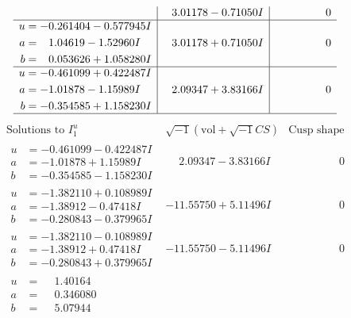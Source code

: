 \documentclass[1p]{elsarticle_modified}
\theoremstyle{definition}
\newcommand{\I}{\sqrt{-1}}
\begin{document}
$$\begin{array}{c|c|c}
 & \phantom{-}3.01178 - 0.71050 I & \phantom{-0.000000 } 0 \\ \hline\begin{aligned}
u &= -0.261404 - 0.577945 I \\
a &= \phantom{-}1.04619 - 1.52960 I \\
b &= \phantom{-}0.053626 + 1.058280 I\end{aligned}
 & \phantom{-}3.01178 + 0.71050 I & \phantom{-0.000000 } 0 \\ \hline\begin{aligned}
u &= -0.461099 + 0.422487 I \\
a &= -1.01878 - 1.15989 I \\
b &= -0.354585 + 1.158230 I\end{aligned}
 & \phantom{-}2.09347 + 3.83166 I & \phantom{-0.000000 } 0\\
 \hline 
 \end{array}$$\newpage$$\begin{array}{c|c|c}  
\text{Solutions to }I^u_{1}& \I (\text{vol} + \sqrt{-1}CS) & \text{Cusp shape}\\
 \hline 
\begin{aligned}
u &= -0.461099 - 0.422487 I \\
a &= -1.01878 + 1.15989 I \\
b &= -0.354585 - 1.158230 I\end{aligned}
 & \phantom{-}2.09347 - 3.83166 I & \phantom{-0.000000 } 0 \\ \hline\begin{aligned}
u &= -1.382110 + 0.108989 I \\
a &= -1.38912 - 0.47418 I \\
b &= -0.280843 - 0.379965 I\end{aligned}
 & -11.55750 + 5.11496 I & \phantom{-0.000000 } 0 \\ \hline\begin{aligned}
u &= -1.382110 - 0.108989 I \\
a &= -1.38912 + 0.47418 I \\
b &= -0.280843 + 0.379965 I\end{aligned}
 & -11.55750 - 5.11496 I & \phantom{-0.000000 } 0 \\ \hline\begin{aligned}
u &= \phantom{-}1.40164\phantom{ +0.000000I} \\
a &= \phantom{-}0.346080\phantom{ +0.000000I} \\
b &= \phantom{-}5.07944\phantom{ +0.000000I}\end{aligned}

\end{array}$$
\end{document}
